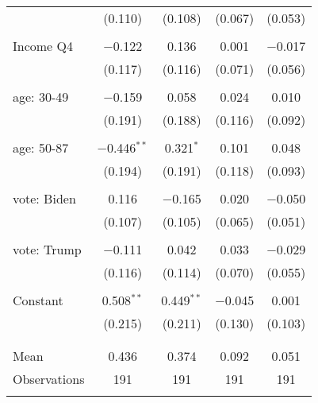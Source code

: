 \begin{tabular}{@{\extracolsep{5pt}}lcccc}
  & (0.110) & (0.108) & (0.067) & (0.053) \\ 
  & & & & \\ 
 Income Q4 & $-$0.122 & 0.136 & 0.001 & $-$0.017 \\ 
  & (0.117) & (0.116) & (0.071) & (0.056) \\ 
  & & & & \\ 
 age: 30-49 & $-$0.159 & 0.058 & 0.024 & 0.010 \\ 
  & (0.191) & (0.188) & (0.116) & (0.092) \\ 
  & & & & \\ 
 age: 50-87 & $-$0.446$^{**}$ & 0.321$^{*}$ & 0.101 & 0.048 \\ 
  & (0.194) & (0.191) & (0.118) & (0.093) \\ 
  & & & & \\ 
 vote: Biden & 0.116 & $-$0.165 & 0.020 & $-$0.050 \\ 
  & (0.107) & (0.105) & (0.065) & (0.051) \\ 
  & & & & \\ 
 vote: Trump & $-$0.111 & 0.042 & 0.033 & $-$0.029 \\ 
  & (0.116) & (0.114) & (0.070) & (0.055) \\ 
  & & & & \\ 
 Constant & 0.508$^{**}$ & 0.449$^{**}$ & $-$0.045 & 0.001 \\ 
  & (0.215) & (0.211) & (0.130) & (0.103) \\ 
  & & & & \\ 
\hline \\[-1.8ex] 
Mean & 0.436 & 0.374 & 0.092 & 0.051 \\ 
Observations & 191 & 191 & 191 & 191 \\ 
\hline 
\hline \\[-1.8ex] 
\end{tabular} 
